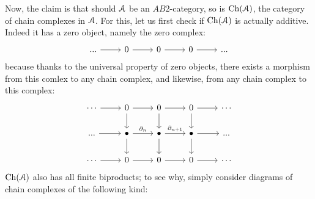 \begin{example}
                    Now, the claim is that should $\mathcal{A}$ be an $AB2$-category, so is $\mathrm{Ch}(\mathcal{A})$, the category of chain complexes in $\mathcal{A}$. For this, let us first check if $\mathrm{Ch}(\mathcal{A})$ is actually additive. Indeed it has a zero object, namely the zero complex:
                        $$
                            \begin{tikzcd}
                            	{...} & 0 & 0 & 0 & {...}
                            	\arrow[from=1-1, to=1-2]
                            	\arrow[from=1-2, to=1-3]
                            	\arrow[from=1-3, to=1-4]
                            	\arrow[from=1-4, to=1-5]
                            \end{tikzcd}
                        $$
                    because thanks to the universal property of zero objects, there exists a morphism from this comlex to any chain complex, and likewise, from any chain complex to this complex:
                        $$
                            \begin{tikzcd}
                            	\cdots & 0 & 0 & 0 & \cdots \\
                            	{...} & \bullet & \bullet & \bullet & {...} \\
                            	\cdots & 0 & 0 & 0 & \cdots
                            	\arrow[from=2-1, to=2-2]
                            	\arrow["{\del_n}", from=2-2, to=2-3]
                            	\arrow["{\del_{n + 1}}", from=2-3, to=2-4]
                            	\arrow[from=2-4, to=2-5]
                            	\arrow[from=1-2, to=2-2]
                            	\arrow[from=2-2, to=3-2]
                            	\arrow[from=1-3, to=2-3]
                            	\arrow[from=2-3, to=3-3]
                            	\arrow[from=1-4, to=2-4]
                            	\arrow[from=2-4, to=3-4]
                            	\arrow[from=1-2, to=1-3]
                            	\arrow[from=1-3, to=1-4]
                            	\arrow[from=3-2, to=3-3]
                            	\arrow[from=3-3, to=3-4]
                            	\arrow[from=1-1, to=1-2]
                            	\arrow[from=1-4, to=1-5]
                            	\arrow[from=3-1, to=3-2]
                            	\arrow[from=3-4, to=3-5]
                            \end{tikzcd}
                        $$
                    $\mathrm{Ch}(\mathcal{A})$ also has all finite biproducts; to see why, simply consider diagrams of chain complexes of the following kind:
                        $$
$$
\end{example}
